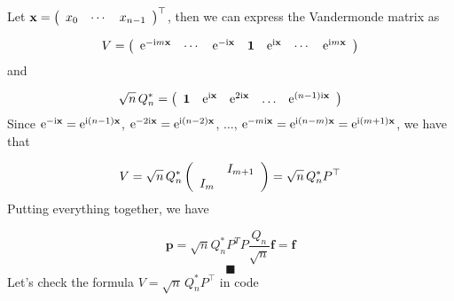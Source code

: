 \documentclass[12pt,a4paper]{article}
\begin{document}
Let $\mathbf{x} = \left(\begin{array}{c c c} x_0 & \cdots & x_{n-1}  \end{array}\right)^{\top}$, then we can express the Vandermonde matrix as

\[
V = 
\left(
\begin{array}{c c c c c c c}
{\rm e}^{-{\rm i}m\mathbf{x}}  & \cdots & {\rm e}^{-{\rm i}\mathbf{x}} &\mathbf{1}  & {\rm e}^{{\rm i}\mathbf{x}} & \cdots & {\rm e}^{{\rm i}m\mathbf{x}}
\end{array}
\right)
\]
and

\[
\sqrt{n}\,Q_n^* = \left(
\begin{array}{c c c c c}
\mathbf{1}  & {\rm e}^{{\rm i}\mathbf{x}} & {\rm e}^{2{\rm i}\mathbf{x}} & \ldots & {\rm e}^{(n-1){\rm i}\mathbf{x}}
\end{array}
\right)
\]
Since ${\rm e}^{-{\rm i}\mathbf{x}} = {\rm e}^{{\rm i}(n-1)\mathbf{x}}$, ${\rm e}^{-2{\rm i}\mathbf{x}} = {\rm e}^{{\rm i}(n-2)\mathbf{x}}$, $\dots$, ${\rm e}^{-m{\rm i}\mathbf{x}} = {\rm e}^{{\rm i}(n-m)\mathbf{x}} = {\rm e}^{{\rm i}(m+1)\mathbf{x}}$, we have that

\[
V = \sqrt{n}\,Q_n^*\left(
\begin{array}{c c}
 & I_{m+1} \\
I_m &
\end{array}
\right) =  \sqrt{n}\,Q_n^* P^{\top}
\]
Putting everything together, we have

\[
\mathbf{p} = \sqrt{n}Q_n^* P^{T} P \frac{Q_n}{\sqrt{n}}\mathbf{f} = \mathbf{f}
\]
\[
\blacksquare
\]
Let's check the formula $V = \sqrt{n}\,Q_n^* P^{\top}$ in code
\end{document}
